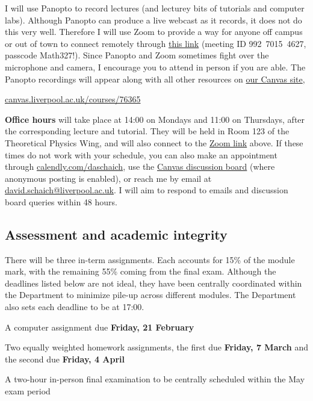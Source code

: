 I will use Panopto to record lectures (and lecturey bits of tutorials and computer labs).
Although Panopto can produce a live webcast as it records, it does not do this very well. %
Therefore I will use Zoom to provide a way for anyone off campus or out of town to connect remotely through \href{https://liverpool-ac-uk.zoom.us/j/99270154627?pwd=opN8TdnbW3xELD4gxPGgAdkIbL61uk.1}{this link} (meeting ID \mbox{992 7015 4627}, passcode Math327!).
Since Panopto and Zoom sometimes fight over the microphone and camera, I encourage you to attend in person if you are able.
The Panopto recordings will appear along with all other resources on \href{https://canvas.liverpool.ac.uk/courses/76365}{our Canvas site}, \\
\centerline{\href{https://canvas.liverpool.ac.uk/courses/76365}{canvas.liverpool.ac.uk/courses/76365}}

\textbf{Office hours} will take place at 14:00 on Mondays and 11:00 on Thursdays, after the corresponding lecture and tutorial.
They will be held in Room 123 of the Theoretical Physics Wing, and will also connect to the \href{https://liverpool-ac-uk.zoom.us/j/99270154627?pwd=opN8TdnbW3xELD4gxPGgAdkIbL61uk.1}{Zoom link} above.
If these times do not work with your schedule, you can also make an appointment through \href{https://calendly.com/daschaich/meet}{calendly.com/daschaich}, use the \href{https://canvas.liverpool.ac.uk/courses/76365/discussion_topics}{Canvas discussion board} (where anonymous posting is enabled), or reach me by email at \href{mailto:david.schaich@liverpool.ac.uk}{david.schaich@liverpool.ac.uk}.
I will aim to respond to emails and discussion board queries within 48 hours.



\subsection*{Assessment and academic integrity}
There will be three in-term assignments.
Each accounts for 15\% of the module mark, with the remaining 55\% coming from the final exam.
Although the deadlines listed below are not ideal, they have been centrally coordinated within the Department to minimize pile-up across different modules.
The Department also sets each deadline to be at 17:00. \\[-28 pt]
\begin{description}
  \setlength{\itemsep}{5pt}
  \setlength{\parskip}{5pt}
  \setlength{\parsep}{5pt}
  \item[15\%] A computer assignment due \textbf{Friday, 21 February}
  \item[30\%] Two equally weighted homework assignments, the first due \textbf{Friday, 7 March} and the second due \textbf{Friday, 4 April}
  \item[55\%] A two-hour in-person final examination to be centrally scheduled within the May exam period
\end{description}
\ \\[-50 pt]

